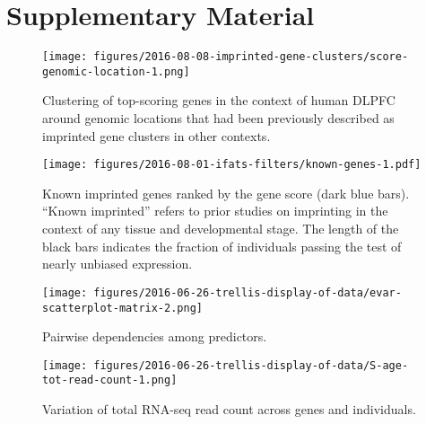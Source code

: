 \documentclass[letterpaper]{article}
\begin{document}



\newpage

\section{Supplementary Material}

\newpage


\setcounter{figure}{0}
\makeatletter 
\renewcommand{\thefigure}{S\@arabic\c@figure}
\makeatother

\begin{figure}
\begin{center}
\texttt{[image: figures/2016-08-08-imprinted-gene-clusters/score-genomic-location-1.png]}
\end{center}
\caption{
Clustering of top-scoring genes in the context of human DLPFC around genomic locations that
had been previously described as imprinted gene clusters in other contexts.
}
\label{fig:clusters}
\end{figure}

\begin{figure}
\begin{center}
\texttt{[image: figures/2016-08-01-ifats-filters/known-genes-1.pdf]}
\caption{Known imprinted genes ranked by the gene score (dark blue bars).
``Known imprinted'' refers to prior studies on imprinting in the context of
any tissue and developmental stage.  The length of the
black bars indicates the fraction of individuals passing the test of nearly
unbiased expression.}
\label{fig:known-genes}
\end{center}
\end{figure}

\begin{figure}
\begin{center}
\texttt{[image: figures/2016-06-26-trellis-display-of-data/evar-scatterplot-matrix-2.png]}
\end{center}
\caption{
Pairwise dependencies among predictors.
}
\label{fig:predictor-associations}
\end{figure}

\begin{figure}
\begin{center}
\texttt{[image: figures/2016-06-26-trellis-display-of-data/S-age-tot-read-count-1.png]}
\end{center}
\caption{Variation of total RNA-seq read count across genes and individuals.}
\label{fig:weight-of-evidence}
\end{figure}
\end{document}
